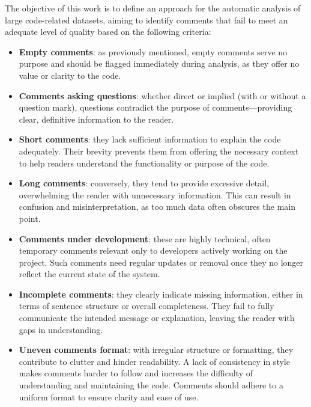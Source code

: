 \noindent The objective of this work is to define an approach for the automatic analysis of large code-related datasets, aiming to identify comments that fail to meet an adequate level of quality based on the following criteria:
\begin{itemize}
	\item \textbf{Empty comments}: as previously mentioned, empty comments serve no purpose and should be flagged immediately during analysis, as they offer no value or clarity to the code.
	\item \textbf{Comments asking questions}: whether direct or implied (with or without a question mark), questions contradict the purpose of comments—providing clear, definitive information to the reader.
	\item \textbf{Short comments}: they lack sufficient information to explain the code adequately. Their brevity prevents them from offering the necessary context to help readers understand the functionality or purpose of the code.
	\item \textbf{Long comments}: conversely, they tend to provide excessive detail, overwhelming the reader with unnecessary information. This can result in confusion and misinterpretation, as too much data often obscures the main point.
	\item \textbf{Comments under development}: these are highly technical, often temporary comments relevant only to developers actively working on the project. Such comments need regular updates or removal once they no longer reflect the current state of the system.
	\item \textbf{Incomplete comments}: they clearly indicate missing information, either in terms of sentence structure or overall completeness. They fail to fully communicate the intended message or explanation, leaving the reader with gaps in understanding.
	\item \textbf{Uneven comments format}: with irregular structure or formatting, they contribute to clutter and hinder readability. A lack of consistency in style makes comments harder to follow and increases the difficulty of understanding and maintaining the code. Comments should adhere to a uniform format to ensure clarity and ease of use.
\end{itemize}

